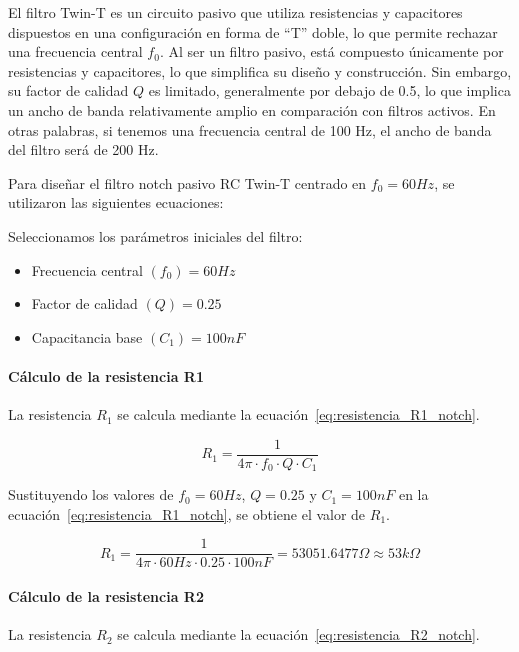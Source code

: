         El filtro Twin-T es un circuito pasivo que utiliza resistencias y capacitores dispuestos en una configuración en forma de ``T'' doble, lo que permite rechazar una frecuencia central $f_0$. Al ser un filtro pasivo, está compuesto únicamente por resistencias y capacitores, lo que simplifica su diseño y construcción. Sin embargo, su factor de calidad $Q$ es limitado, generalmente por debajo de 0.5, lo que implica un ancho de banda relativamente amplio en comparación con filtros activos. En otras palabras, si tenemos una frecuencia central de 100 Hz, el ancho de banda del filtro será de 200 Hz.

        Para diseñar el filtro notch pasivo RC Twin-T centrado en $f_0 = 60 Hz$, se utilizaron las siguientes ecuaciones:

        Seleccionamos los parámetros iniciales del filtro:
        \begin{itemize}
            \item Frecuencia central $(f_0) = 60 Hz$
            \item Factor de calidad $(Q) = 0.25$
            \item Capacitancia base $(C_1) = 100 nF$
        \end{itemize}

        \paragraph{Cálculo de la resistencia R1}
        La resistencia $R_1$ se calcula mediante la ecuación~\ref{eq:resistencia_R1_notch}.

        \begin{equation}
            \label{eq:resistencia_R1_notch}
            R_1 = \frac{1}{4\pi \cdot f_0 \cdot Q \cdot C_1}
        \end{equation}

        Sustituyendo los valores de $f_0 = 60 Hz$, $Q = 0.25$ y $C_1 = 100 nF$ en la ecuación~\ref{eq:resistencia_R1_notch}, se obtiene el valor de $R_1$.

        \begin{equation}
            R_1 = \frac{1}{4\pi \cdot 60 Hz \cdot 0.25 \cdot 100 nF} = 53051.6477 \Omega \approx 53 k\Omega
        \end{equation}

        \paragraph{Cálculo de la resistencia R2}
        La resistencia $R_2$ se calcula mediante la ecuación~\ref{eq:resistencia_R2_notch}.

